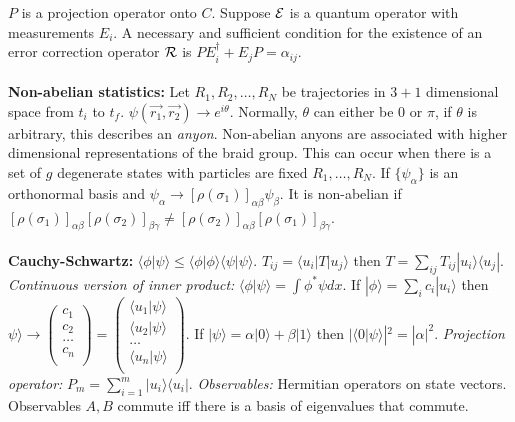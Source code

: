 $P$ is a projection
operator onto $C$.  Suppose ${\cal E}$ is a quantum operator with measurements $E_i$.  A
necessary and sufficient condition for the existence of an error
correction operator ${\cal R}$ is $P E_i^{\dagger}+E_jP= \alpha_{ij}$.
\\
\\
{\bf Non-abelian statistics:}
Let $R_1, R_2, \ldots, R_N$ be trajectories in $3+1$ dimensional space from $t_i$ to
$t_f$.  $\psi({\vec {r_1}}, {\vec {r_2}}) \rightarrow e^{i \theta}$.  Normally, $\theta$ can
either be $0$ or $\pi$, if $\theta$ is arbitrary, this describes an \emph{anyon}.
Non-abelian anyons are associated with higher dimensional representations of the braid group.
This can occur when there is a set of $g$ degenerate states with particles are
fixed $R_1, \ldots, R_N$.  If $\{ \psi_{\alpha} \}$ is an orthonormal basis and
$\psi_{\alpha} \rightarrow [\rho(\sigma_1)]_{\alpha \beta} \psi_{\beta}$.  It is non-abelian
if $ [\rho(\sigma_1)]_{\alpha \beta} [\rho(\sigma_2)]_{\beta \gamma} \ne
[\rho(\sigma_2)]_{\alpha \beta} [\rho(\sigma_1)]_{\beta \gamma}$.
\\
\\
{\bf Cauchy-Schwartz:} $ \langle \phi | \psi \rangle  \le  \langle \phi | \phi \rangle   \langle \psi|\psi \rangle $.   $T_{ij}=  \langle u_i|T|u_j \rangle $ then
$T= \sum_{ij} T_{ij} |u_i \rangle  \langle u_j|$.
\emph{Continuous version of inner product:} 
$ \langle \phi | \psi \rangle  = \int \phi^* \psi dx $.
If $|\phi \rangle = \sum_i c_i |u_i \rangle $ then $\psi \rangle  \rightarrow
\left(
\begin{array}{c}
c_1 \\
c_2 \\
\ldots \\
c_n \\
\end{array} 
\right)
=
\left(
\begin{array}{c}
 \langle u_1 | \psi \rangle  \\
 \langle u_2 | \psi \rangle  \\
\ldots \\
 \langle u_n | \psi \rangle  \\
\end{array} 
\right) $.
If $|\psi \rangle = \alpha |0 \rangle  + \beta |1 \rangle $ then $| \langle 0|\psi \rangle |^2= |\alpha|^2$.
\emph{Projection operator:} $P_m = \sum_{i=1}^m |u_i \rangle \langle u_i|$.  
\emph{Observables:} Hermitian operators on
state vectors.  
Observables $A, B$ commute iff there is a basis of eigenvalues that commute.
